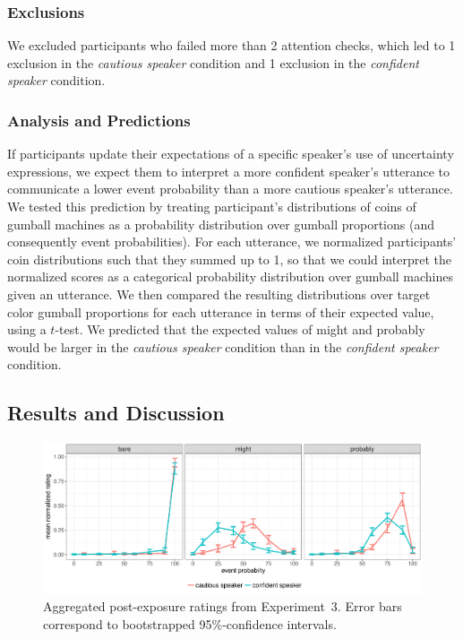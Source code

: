 \subsubsection{Exclusions}

We excluded participants who failed more than 2 attention checks, which led to 1 exclusion in the \emph{cautious speaker} condition and 1 exclusion in the \emph{confident speaker} condition.


\subsubsection{Analysis and Predictions}

If participants update their expectations of a specific speaker's use of uncertainty expressions,  we expect them to interpret a more confident speaker's utterance 
to communicate a lower event probability than a more cautious speaker's utterance. We tested this prediction by treating participant's distributions of coins 
of gumball machines as a probability distribution over gumball proportions (and consequently event probabilities).  For each utterance, we 
normalized participants' coin distributions such that they summed up to 1, so that we could interpret the normalized scores 
as a categorical probability distribution over gumball machines given an utterance. We then compared the resulting distributions
over target color gumball proportions for each utterance in terms of their expected value, using a $t$-test.
 We predicted that the expected values of 
{\sc might} and {\sc probably} would be larger in the \emph{cautious speaker} condition than in the \emph{confident speaker} condition.

\subsection{Results and Discussion}

\begin{figure}
\includegraphics[width=\textwidth]{plots/fig-14-exp-2-ratings.pdf}
\caption{Aggregated post-exposure ratings from Experiment~3. Error bars correspond to bootstrapped 95\%-confidence intervals.  \label{fig:adaptation-results-comp}}
\end{figure}

